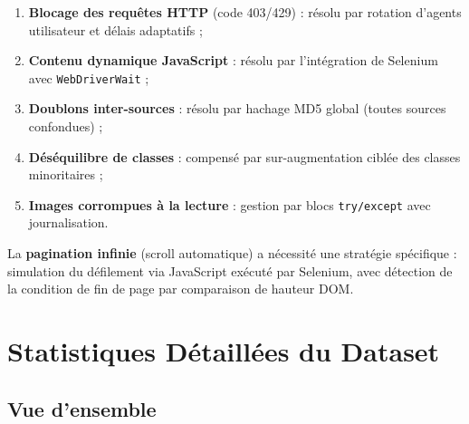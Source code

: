 \documentclass[12pt,a4paper]{article}
\begin{document}
\begin{warnbox}
\begin{enumerate}[noitemsep]
  \item \textbf{Blocage des requêtes HTTP} (code 403/429) : résolu par rotation
        d'agents utilisateur et délais adaptatifs ;
  \item \textbf{Contenu dynamique JavaScript} : résolu par l'intégration de
        Selenium avec \texttt{WebDriverWait} ;
  \item \textbf{Doublons inter-sources} : résolu par hachage MD5 global
        (toutes sources confondues) ;
  \item \textbf{Déséquilibre de classes} : compensé par sur-augmentation ciblée
        des classes minoritaires ;
  \item \textbf{Images corrompues à la lecture} : gestion par blocs
        \texttt{try/except} avec journalisation.
\end{enumerate}
\end{warnbox}

La \textbf{pagination infinie} (scroll automatique) a nécessité une stratégie
spécifique : simulation du défilement via JavaScript exécuté par Selenium,
avec détection de la condition de fin de page par comparaison de hauteur DOM.

\section{Statistiques Détaillées du Dataset}

\subsection{Vue d'ensemble}
\end{document}
